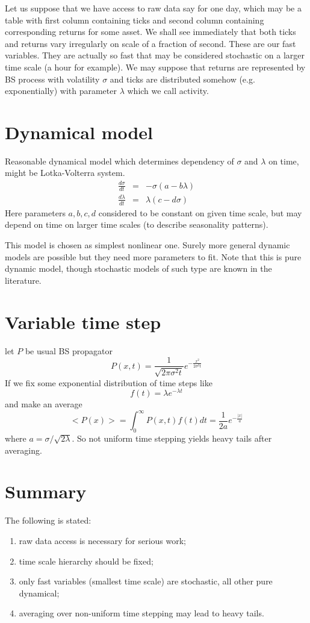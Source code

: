 \documentclass[12pt]{article}
\begin{document}
Let us suppose that we have access to raw data say for one day, which may be a table with  first column containing ticks  and second column containing corresponding  returns for some asset. We shall see immediately that both ticks and returns vary irregularly on scale of a fraction of second. These are our fast variables. They are actually so fast that may be considered stochastic on a larger time scale (a hour for example). We may suppose that returns are represented by BS process with volatility $\sigma$ and ticks are distributed somehow (e.g. exponentially)  with parameter $\lambda$ which we  call activity.
\section {Dynamical model}
Reasonable dynamical model which determines dependency of $\sigma$ and $\lambda$ on time, might be Lotka-Volterra system. 
\begin{eqnarray}
    \frac{d\sigma}{d  t} &=& -\sigma(a-b\lambda) \nonumber \\
    \frac{d\lambda}{d t} &=& \lambda(c-d\sigma) \label{LV}
\end{eqnarray}
Here parameters $a,b,c,d$ considered to be constant on given time scale, but may depend on time on larger time scales (to describe seasonality patterns).

This model is chosen as simplest nonlinear one. Surely more general dynamic models are possible but they need more parameters to fit. Note that this is pure dynamic model, though stochastic models of such type are known in the literature.
\section{Variable time step}
let $P$ be usual BS propagator
\begin{equation}
    P(x,t)=\frac{1}{\sqrt{2\pi \sigma^2 t}}e^{-\frac{x^2}{2\sigma^2 t}} \label{pbs}
\end{equation} 
If we fix some exponential distribution of time steps like
\begin{equation}
    f(t)=\lambda e^{-\lambda t} \label{etstep}
\end{equation}
and make an average
\begin{equation}
    <P(x)>=\int_0^\infty P(x,t) f(t) dt=\frac{1}{2 a} e^{-\frac{|x|}{a}} \label{ebs}
\end{equation}
where $a=\sigma/\sqrt{2\lambda}$. So not uniform time stepping yields heavy tails after averaging.
\section{Summary}
The following is stated:
\begin{enumerate}
    \item raw data access is necessary for  serious work;
    \item time scale hierarchy should be fixed;
    \item only fast variables (smallest time scale) are stochastic, all other pure dynamical;
    \item averaging over non-uniform time stepping may lead to heavy tails.
\end{enumerate}
\end{document}
